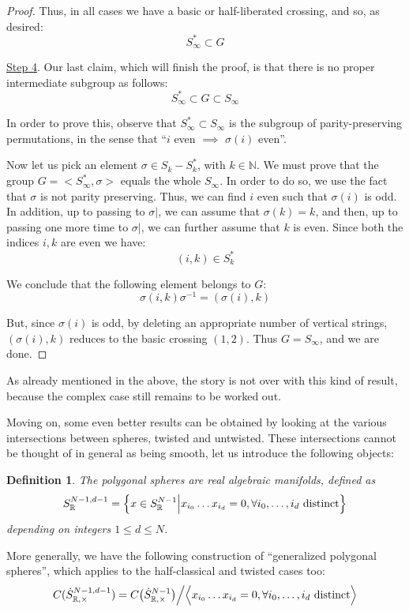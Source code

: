 \documentclass[12pt]{amsbook}
\newtheorem{definition}[theorem]{Definition}
\begin{document}
\begin{proof}
Thus, in all cases we have a basic or half-liberated crossing, and so, as desired: 
$$S_\infty^*\subset G$$

\underline{Step 4}. Our last claim, which will finish the proof, is that there is no proper intermediate subgroup as follows:
$$S_\infty^*\subset G\subset S_\infty$$

In order to prove this, observe that $S_\infty^*\subset S_\infty$ is the subgroup of parity-preserving permutations, in the sense that ``$i$ even $\implies$ $\sigma(i)$ even''. 

\medskip

Now let us pick an element $\sigma\in S_k-S_k^*$, with $k\in\mathbb N$. We must prove that the group $G=<S_\infty^*,\sigma>$ equals the whole $S_\infty$. In order to do so, we use the fact that $\sigma$ is not parity preserving. Thus, we can find $i$ even such that $\sigma(i)$ is odd. In addition, up to passing to $\sigma|$, we can assume that $\sigma(k)=k$, and then, up to passing one more time to $\sigma|$, we can further assume that $k$ is even. Since both the indices $i,k$ are even we have:
$$(i,k)\in S_k^*$$

We conclude that the following element belongs to $G$:
$$\sigma(i,k)\sigma^{-1}=(\sigma(i),k)$$

But, since $\sigma(i)$ is odd, by deleting an appropriate number of vertical strings, $(\sigma(i),k)$ reduces to the basic crossing $(1,2)$. Thus $G=S_\infty$, and we are done.
\end{proof}

As already mentioned in the above, the story is not over with this kind of result, because the complex case still remains to be worked out.

\bigskip

Moving on, some even better results can be obtained by looking at the various intersections between spheres, twisted and untwisted. These intersections cannot be thought of in general as being smooth, let us introduce the following objects:

\begin{definition}
The polygonal spheres are real algebraic manifolds, defined as
$$S^{N-1,d-1}_\mathbb R=\left\{x\in S^{N-1}_\mathbb R\Big|x_{i_0}\ldots x_{i_d}=0,\forall i_0,\ldots,i_d\ {\rm distinct}\right\}$$
depending on integers $1\leq d\leq N$.
\end{definition}

More generally, we have the following construction of ``generalized polygonal spheres'', which applies to the half-classical and twisted cases too:
$$C(\dot{S}^{N-1,d-1}_{\mathbb R,\times})=C\big(\dot{S}^{N-1}_{\mathbb R,\times}\big)\Big/\Big<x_{i_0}\ldots x_{i_d}=0,\forall i_0,\ldots,i_d\ {\rm distinct}\Big>$$
\end{document}
